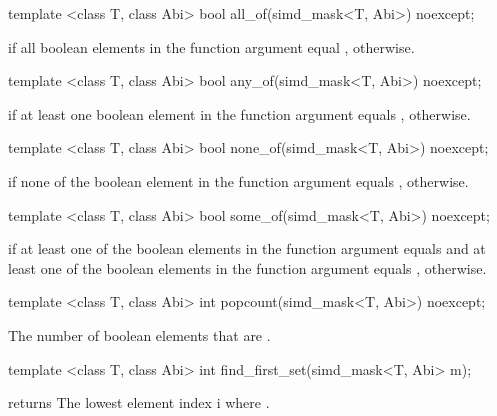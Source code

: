 \begin{itemdecl}
template <class T, class Abi> bool  all_of(simd_mask<T, Abi>) noexcept;
\end{itemdecl}
\begin{itemdescr}
  \pnum\returns \true if all boolean elements in the function argument equal \true, \false otherwise.
\end{itemdescr}

\begin{itemdecl}
template <class T, class Abi> bool  any_of(simd_mask<T, Abi>) noexcept;
\end{itemdecl}
\begin{itemdescr}
  \pnum\returns \true if at least one boolean element in the function argument equals \true, \false otherwise.
\end{itemdescr}

\begin{itemdecl}
template <class T, class Abi> bool none_of(simd_mask<T, Abi>) noexcept;
\end{itemdecl}
\begin{itemdescr}
  \pnum\returns \true if none of the boolean element in the function argument equals \true, \false otherwise.
\end{itemdescr}

\begin{itemdecl}
template <class T, class Abi> bool some_of(simd_mask<T, Abi>) noexcept;
\end{itemdecl}
\begin{itemdescr}
  \pnum\returns \true if at least one of the boolean elements in the function argument equals \true and at least one of the boolean elements in the function argument equals \false, \false otherwise.
\end{itemdescr}

\begin{itemdecl}
template <class T, class Abi> int popcount(simd_mask<T, Abi>) noexcept;
\end{itemdecl}
\begin{itemdescr}
  \pnum\returns The number of boolean elements that are \true.
\end{itemdescr}

\begin{itemdecl}
template <class T, class Abi> int find_first_set(simd_mask<T, Abi> m);
\end{itemdecl}
\begin{itemdescr}
  \pnum\requires {} returns \true
  \pnum\returns The lowest element index \code i where .
\end{itemdescr}

